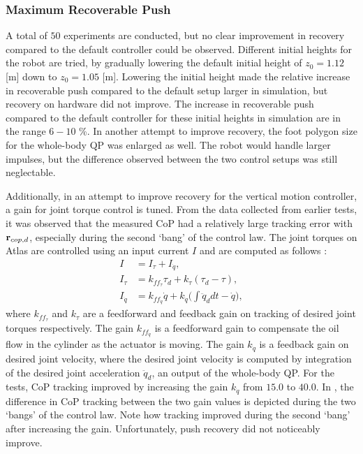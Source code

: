 \subsubsection{Maximum Recoverable Push}
A total of $50$ experiments are conducted, but no clear improvement in recovery compared to the default controller could be observed. Different initial heights for the robot are tried, by gradually lowering the default initial height of $z_0=1.12$ [m] down to $z_0=1.05$ [m]. Lowering the initial height made the relative increase in recoverable push compared to the default setup larger in simulation, but recovery on hardware did not improve. The increase in recoverable push compared to the default controller for these initial heights in simulation are in the range $6-10$ \%. In another attempt to improve recovery, the foot polygon size for the whole-body \ac{QP} was enlarged as well. The robot would handle larger impulses, but the difference observed between the two control setups was still neglectable.

Additionally, in an attempt to improve recovery for the vertical motion controller, a gain for joint torque control is tuned. From the data collected from earlier tests, it was observed that the measured \ac{CoP} had a relatively large tracking error with $\mathbf{r}_{cop,d}$, especially during the second `bang' of the control law. The joint torques on Atlas are controlled using an input current $I$ and are computed as follows \cite{koolen2016design}:
\begin{align}
	I &= I_{\tau} + I_{\dot{q}},\\
	I_{\tau} &= k_{ff_{\tau}}\tau_{d} + k_{\tau}(\tau_{d} - \tau),\\
	I_{\dot{q}} &= k_{ff_{\dot{q}}}\dot{q} + k_{\dot{q}}\bigg(\int \ddot{q}_d dt - \dot{q} \bigg),
\end{align}
where $k_{ff_{\tau}}$ and $k_{\tau}$ are a feedforward and feedback gain on tracking of desired joint torques respectively. The gain $k_{ff_{\dot{q}}}$ is a feedforward gain to compensate the oil flow in the cylinder as the actuator is moving. The gain $k_{\dot{q}}$ is a feedback gain on desired joint velocity, where the desired joint velocity is computed by integration of the desired joint acceleration $\ddot{q}_d$, an output of the whole-body \ac{QP}. For the tests, \ac{CoP} tracking improved by increasing the gain $k_{\dot{q}}$ from $15.0$ to $40.0$. In , the difference in \ac{CoP} tracking between the two gain values is depicted during the two `bangs' of the control law. Note how tracking improved during the second `bang' after increasing the gain. Unfortunately, push recovery did not noticeably improve.

